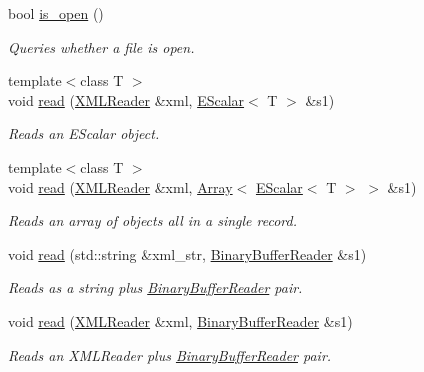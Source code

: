 \begin{DoxyCompactItemize}
bool \mbox{\hyperlink{classADATIO_1_1ADATFileReader_ga601972c66a6e6671d7b41ee1bce80e82}{is\+\_\+open}} ()
\begin{DoxyCompactList}\small\item\em Queries whether a file is open. \end{DoxyCompactList}\item 
{\footnotesize template$<$class T $>$ }\\void \mbox{\hyperlink{classADATIO_1_1ADATFileReader_gac92ce1b0fee7c00b8a7dc988f3d4906e}{read}} (\mbox{\hyperlink{classADATXML_1_1XMLReader}{X\+M\+L\+Reader}} \&xml, \mbox{\hyperlink{classENSEM_1_1EScalar}{E\+Scalar}}$<$ T $>$ \&s1)
\begin{DoxyCompactList}\small\item\em Reads an E\+Scalar object. \end{DoxyCompactList}\item 
{\footnotesize template$<$class T $>$ }\\void \mbox{\hyperlink{classADATIO_1_1ADATFileReader_ga32969d6bfdfe9da2912e92d1f0871c20}{read}} (\mbox{\hyperlink{classADATXML_1_1XMLReader}{X\+M\+L\+Reader}} \&xml, \mbox{\hyperlink{classXMLArray_1_1Array}{Array}}$<$ \mbox{\hyperlink{classENSEM_1_1EScalar}{E\+Scalar}}$<$ T $>$ $>$ \&s1)
\begin{DoxyCompactList}\small\item\em Reads an array of objects all in a single record. \end{DoxyCompactList}\item 
void \mbox{\hyperlink{classADATIO_1_1ADATFileReader_ga2179348a566e0224ed2122acfabf8bc9}{read}} (std\+::string \&xml\+\_\+str, \mbox{\hyperlink{classADATIO_1_1BinaryBufferReader}{Binary\+Buffer\+Reader}} \&s1)
\begin{DoxyCompactList}\small\item\em Reads as a string plus \mbox{\hyperlink{classADATIO_1_1BinaryBufferReader}{Binary\+Buffer\+Reader}} pair. \end{DoxyCompactList}\item 
void \mbox{\hyperlink{classADATIO_1_1ADATFileReader_gadf1e0b4405e14798a0610efd8774f8d0}{read}} (\mbox{\hyperlink{classADATXML_1_1XMLReader}{X\+M\+L\+Reader}} \&xml, \mbox{\hyperlink{classADATIO_1_1BinaryBufferReader}{Binary\+Buffer\+Reader}} \&s1)
\begin{DoxyCompactList}\small\item\em Reads an X\+M\+L\+Reader plus \mbox{\hyperlink{classADATIO_1_1BinaryBufferReader}{Binary\+Buffer\+Reader}} pair. \end{DoxyCompactList}\item 

\end{DoxyCompactItemize}
